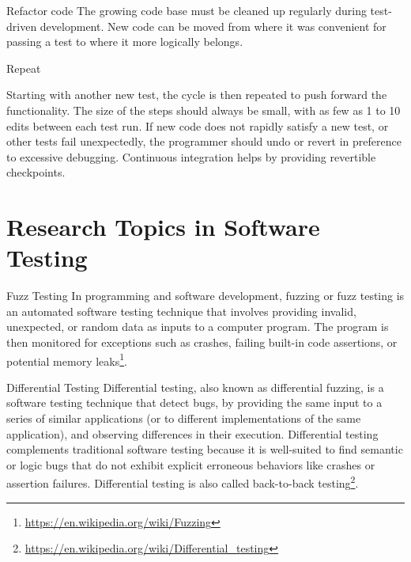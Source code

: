 \documentclass{beamer}
\begin{document}
\begin{frame}[t]{Refactor code}
The growing code base must be cleaned up regularly during test-driven development. New code can be moved from where it was convenient for passing a test to where it more logically belongs. %
    
\end{frame}


\begin{frame}[t]{Repeat}
    
Starting with another new test, the cycle is then repeated to push forward the functionality. The size of the steps should always be small, with as few as 1 to 10 edits between each test run. If new code does not rapidly satisfy a new test, or other tests fail unexpectedly, the programmer should undo or revert in preference to excessive debugging. Continuous integration helps by providing revertible checkpoints. %
\end{frame}

\section{Research Topics in Software Testing}
\begin{frame}[t]{Fuzz Testing}
In programming and software development, fuzzing or fuzz testing is an automated software testing technique that involves providing invalid, unexpected, or random data as inputs to a computer program. The program is then monitored for exceptions such as crashes, failing built-in code assertions, or potential memory leaks\footnote{\url{https://en.wikipedia.org/wiki/Fuzzing}}.
\end{frame}

\begin{frame}[t]{Differential Testing}
Differential testing, also known as differential fuzzing, is a software testing technique that detect bugs, by providing the same input to a series of similar applications (or to different implementations of the same application), and observing differences in their execution. Differential testing complements traditional software testing because it is well-suited to find semantic or logic bugs that do not exhibit explicit erroneous behaviors like crashes or assertion failures. Differential testing is also called back-to-back testing\footnote{\url{https://en.wikipedia.org/wiki/Differential_testing}}.
\end{frame}
\end{document}
